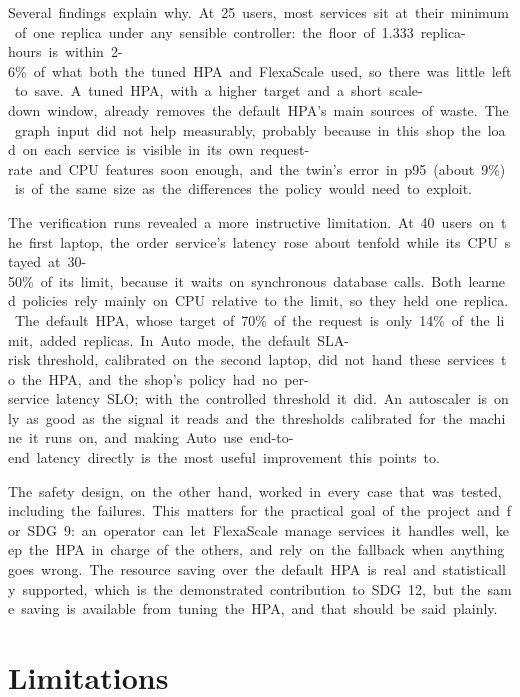 \documentclass[12pt,a4paper,oneside]{report}
\begin{document}
Several~findings~explain~why.~At~25~users,~most~services~sit~at~their~minimum~of~one~replica~under~any~sensible~controller:~the~floor~of~1.333~replica-hours~is~within~2-6\%~of~what~both~the~tuned~HPA~and~FlexaScale~used,~so~there~was~little~left~to~save.~A~tuned~HPA,~with~a~higher~target~and~a~short~scale-down~window,~already~removes~the~default~HPA's~main~sources~of~waste.~The~graph~input~did~not~help~measurably,~probably~because~in~this~shop~the~load~on~each~service~is~visible~in~its~own~request-rate~and~CPU~features~soon~enough,~and~the~twin's~error~in~p95~(about~9\%)~is~of~the~same~size~as~the~differences~the~policy~would~need~to~exploit.


The~verification~runs~revealed~a~more~instructive~limitation.~At~40~users~on~the~first~laptop,~the~order~service's~latency~rose~about~tenfold~while~its~CPU~stayed~at~30-50\%~of~its~limit,~because~it~waits~on~synchronous~database~calls.~Both~learned~policies~rely~mainly~on~CPU~relative~to~the~limit,~so~they~held~one~replica.~The~default~HPA,~whose~target~of~70\%~of~the~request~is~only~14\%~of~the~limit,~added~replicas.~In~Auto~mode,~the~default~SLA-risk~threshold,~calibrated~on~the~second~laptop,~did~not~hand~these~services~to~the~HPA,~and~the~shop's~policy~had~no~per-service~latency~SLO;~with~the~controlled~threshold~it~did.~An~autoscaler~is~only~as~good~as~the~signal~it~reads~and~the~thresholds~calibrated~for~the~machine~it~runs~on,~and~making~Auto~use~end-to-end~latency~directly~is~the~most~useful~improvement~this~points~to.


The~safety~design,~on~the~other~hand,~worked~in~every~case~that~was~tested,~including~the~failures.~This~matters~for~the~practical~goal~of~the~project~and~for~SDG~9:~an~operator~can~let~FlexaScale~manage~services~it~handles~well,~keep~the~HPA~in~charge~of~the~others,~and~rely~on~the~fallback~when~anything~goes~wrong.~The~resource~saving~over~the~default~HPA~is~real~and~statistically~supported,~which~is~the~demonstrated~contribution~to~SDG~12,~but~the~same~saving~is~available~from~tuning~the~HPA,~and~that~should~be~said~plainly.


\section{Limitations}
\end{document}
